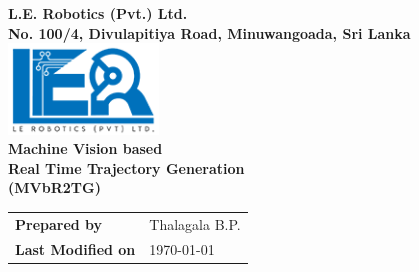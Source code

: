 \begin{titlepage}
\center %

\textbf{\Large L.E. Robotics (Pvt.) Ltd.}\\[0.5cm]
\textbf{\large No. 100/4, Divulapitiya Road, Minuwangoada,	Sri Lanka}\\[2cm]

\includegraphics[width=0.3\textwidth]{figures/logoler}\\[2cm]

	
\textbf{\Huge Machine Vision based\\ Real Time Trajectory Generation\\ (MVbR2TG)}\\[6cm]




\vfill

\begin{tabular}[!h]{ l l}
\textbf{\large Prepared by} & {\large Thalagala B.P.}\\
\textbf{\large Last Modified on}&  {\large \today}
\end{tabular}

%



\end{titlepage}